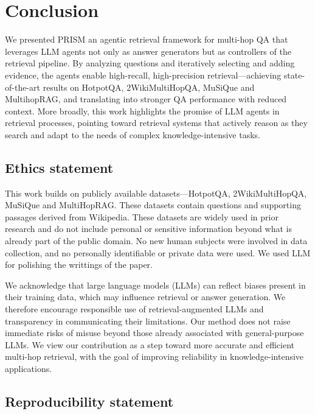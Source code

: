 \documentclass{article} %
\begin{document}
\vspace{-1.0em}

\section{Conclusion}
\vspace{-0.5em}
We presented PRISM an agentic retrieval framework for multi-hop QA that leverages LLM agents not only as answer generators but as controllers of the retrieval pipeline. By analyzing questions and iteratively selecting and adding evidence, the agents enable high-recall, high-precision retrieval—achieving state-of-the-art results on HotpotQA, 2WikiMultiHopQA, MuSiQue and MultihopRAG, and translating into stronger QA performance with reduced context. More broadly, this work highlights the promise of LLM agents in retrieval processes, pointing toward retrieval systems that actively reason as they search and adapt to the needs of complex knowledge-intensive tasks.


\subsection*{Ethics statement}

This work builds on publicly available datasets—HotpotQA, 2WikiMultiHopQA, MuSiQue and MultiHopRAG. These datasets contain questions and supporting passages derived from Wikipedia. These datasets are widely used in prior research and do not include personal or sensitive information beyond what is already part of the public domain. No new human subjects were involved in data collection, and no personally identifiable or private data were used. We used LLM for polishing the writtings of the paper. 

We acknowledge that large language models (LLMs) can reflect biases present in their training data, which may influence retrieval or answer generation. We therefore encourage responsible use of retrieval-augmented LLMs and transparency in communicating their limitations. Our method does not raise immediate risks of misuse beyond those already associated with general-purpose LLMs. We view our contribution as a step toward more accurate and efficient multi-hop retrieval, with the goal of improving reliability in knowledge-intensive applications.

\subsection*{Reproducibility statement}
\end{document}
